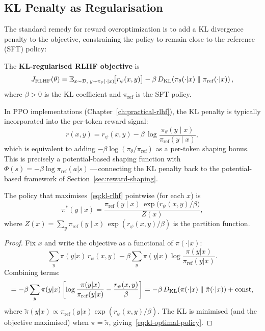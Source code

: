 \subsection{KL Penalty as Regularisation}

The standard remedy for reward overoptimization is to add a KL divergence penalty to the objective, constraining the policy to remain close to the reference (SFT) policy:

\begin{definition}
\label{def:kl-rlhf}
The \textbf{KL-regularised RLHF objective} is
\begin{equation}
\label{eq:kl-rlhf}
J_{\mathrm{RLHF}}(\theta)
= \operatorname{\mathbb{E}}_{x \sim \mathcal{D},\; y \sim \pi_\theta(\cdot|x)}\!\bigl[r_\psi(x, y)\bigr]
- \beta\,D_{\mathrm{KL}}\!\left(\pi_\theta(\cdot|x)\;\|\;\pi_{\mathrm{ref}}(\cdot|x)\right),
\end{equation}
where $\beta > 0$ is the KL coefficient and $\pi_{\mathrm{ref}}$ is the SFT policy.
\end{definition}

In PPO implementations (Chapter~\ref{ch:practical-rlhf}), the KL penalty is typically incorporated into the per-token reward signal:
\begin{equation}
\label{eq:kl-token-reward}
r(x, y) = r_\psi(x, y) - \beta\,\log\frac{\pi_\theta(y \mid x)}{\pi_{\mathrm{ref}}(y \mid x)},
\end{equation}
which is equivalent to adding $-\beta\log(\pi_\theta/\pi_{\mathrm{ref}})$ as a per-token shaping bonus. This is precisely a potential-based shaping function with $\Phi(s) = -\beta\log\pi_{\mathrm{ref}}(a|s)$\,---\,connecting the KL penalty back to the potential-based framework of Section~\ref{sec:reward-shaping}.

\begin{theorem}
\label{thm:kl-optimal-policy}
The policy that maximises~\eqref{eq:kl-rlhf} pointwise (for each $x$) is
\begin{equation}
\label{eq:kl-optimal-policy}
\pi^*(y \mid x) = \frac{\pi_{\mathrm{ref}}(y \mid x)\,\exp\!\bigl(r_\psi(x, y)/\beta\bigr)}{Z(x)},
\end{equation}
where $Z(x) = \sum_y \pi_{\mathrm{ref}}(y \mid x)\,\exp(r_\psi(x, y)/\beta)$ is the partition function.
\end{theorem}

\begin{proof}
Fix $x$ and write the objective as a functional of $\pi(\cdot|x)$:
\[
\sum_y \pi(y|x)\,r_\psi(x,y) - \beta\sum_y \pi(y|x)\log\frac{\pi(y|x)}{\pi_{\mathrm{ref}}(y|x)}.
\]
Combining terms:
\[
= -\beta\sum_y \pi(y|x)\left[\log\frac{\pi(y|x)}{\pi_{\mathrm{ref}}(y|x)} - \frac{r_\psi(x,y)}{\beta}\right]
= -\beta\,D_{\mathrm{KL}}\!\left(\pi(\cdot|x)\;\|\;\tilde\pi(\cdot|x)\right) + \text{const},
\]
where $\tilde\pi(y|x) \propto \pi_{\mathrm{ref}}(y|x)\exp(r_\psi(x,y)/\beta)$. The KL is minimised (and the objective maximised) when $\pi = \tilde\pi$, giving~\eqref{eq:kl-optimal-policy}.
\end{proof}

